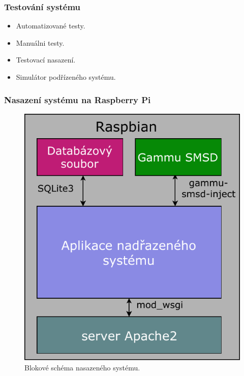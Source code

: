 \documentclass{beamer}
\begin{document}
  \begin{frame}
    \frametitle{Testování systému}

    \begin{itemize}
      \item Automatizované testy. %
      \item Manuálni testy. %
      \item Testovací nasazení.
      \item Simulátor podřízeného systému.
    \end{itemize}

  \end{frame}

  \begin{frame}
    \frametitle{Nasazení systému na Raspberry Pi}

    \begin{figure}
        \includegraphics[scale=0.55]{../images/sw_block.pdf}
        \caption{Blokové schéma nasazeného systému.}
      \end{figure}


  \end{frame}
\end{document}
